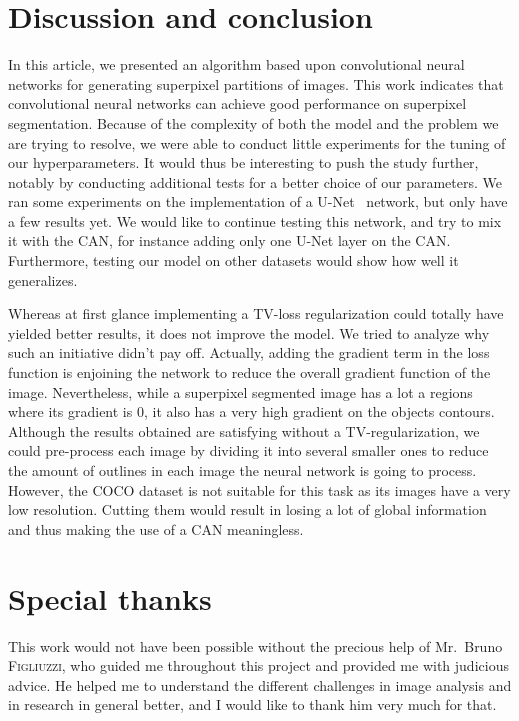 \documentclass{article}
\begin{document}
\section{Discussion and conclusion}
    In this article, we presented an algorithm based upon convolutional neural networks for generating superpixel partitions of images. This work indicates that convolutional neural networks can achieve good performance on superpixel segmentation. Because of the complexity of both the model and the problem we are trying to resolve, we were able to conduct little experiments for the tuning of our hyperparameters. It would thus be interesting to push the study further, notably by conducting additional tests for a better choice of our parameters. We ran some experiments on the implementation of a U-Net~\cite{unet2015} network, but only have a few results yet. We would like to continue testing this network, and try to mix it with the CAN, for instance adding only one U-Net layer on the CAN. Furthermore, testing our model on other datasets would show how well it generalizes.

    Whereas at first glance implementing a TV-loss regularization could totally have yielded better results, it does not improve the model. We tried to analyze why such an initiative didn't pay off. Actually, adding the gradient term in the loss function is enjoining the network to reduce the overall gradient function of the image. Nevertheless, while a superpixel segmented image has a lot a regions where its gradient is 0, it also has a very high gradient on the objects contours.
    Although the results obtained are satisfying without a TV-regularization, we could pre-process each image by dividing it into several smaller ones to reduce the amount of outlines in each image the neural network is going to process. However, the COCO dataset is not suitable for this task as its images have a very low resolution. Cutting them would result in losing a lot of global information and thus making the use of a CAN meaningless.


\newpage
\section*{Special thanks}
This work would not have been possible without the precious help of Mr.~Bruno \textsc{Figliuzzi}, who guided me throughout this project and provided me with judicious advice. He helped me to understand the different challenges in image analysis and in research in general better, and I would like to thank him very much for that.
\end{document}
